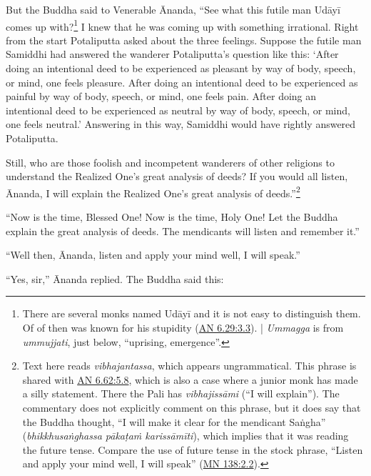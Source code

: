 \documentclass[12pt,openany]{book}%
\begin{document}
But the Buddha said to Venerable Ānanda, “See what this futile man \textsanskrit{Udāyī} comes up with?\footnote{There are several monks named \textsanskrit{Udāyī} and it is not easy to distinguish them. Of of then was known for his stupidity (\href{https://suttacentral.net/an6.29/en/sujato\#3.3}{AN 6.29:3.3}). | \textit{Ummagga} is from \textit{ummujjati}, just below, “uprising, emergence”. } I knew that he was coming up with something irrational. Right from the start Potaliputta asked about the three feelings. Suppose the futile man Samiddhi had answered the wanderer Potaliputta’s question like this: ‘After doing an intentional deed to be experienced as pleasant by way of body, speech, or mind, one feels pleasure. After doing an intentional deed to be experienced as painful by way of body, speech, or mind, one feels pain. After doing an intentional deed to be experienced as neutral by way of body, speech, or mind, one feels neutral.’ Answering in this way, Samiddhi would have rightly answered Potaliputta. 

Still, who are those foolish and incompetent wanderers of other religions to understand the Realized One’s great analysis of deeds? If you would all listen, Ānanda, I will explain the Realized One’s great analysis of deeds.”\footnote{Text here reads \textit{vibhajantassa}, which appears ungrammatical. This phrase is shared with \href{https://suttacentral.net/an6.62/en/sujato\#5.8}{AN 6.62:5.8}, which is also a case where a junior monk has made a silly statement. There the Pali has \textit{\textsanskrit{vibhajissāmi}} (“I will explain”). The commentary does not explicitly comment on this phrase, but it does say that the Buddha thought, “I will make it clear for the mendicant \textsanskrit{Saṅgha}” (\textit{\textsanskrit{bhikkhusaṅghassa} \textsanskrit{pākaṭaṁ} \textsanskrit{karissāmīti}}), which implies that it was reading the future tense. Compare the use of future tense in the stock phrase, “Listen and apply your mind well, I will speak” (\href{https://suttacentral.net/mn138/en/sujato\#2.2}{MN 138:2.2}). } 

“Now is the time, Blessed One! Now is the time, Holy One! Let the Buddha explain the great analysis of deeds. The mendicants will listen and remember it.” 

“Well then, Ānanda, listen and apply your mind well, I will speak.” 

“Yes, sir,” Ānanda replied. The Buddha said this: 
\end{document}
